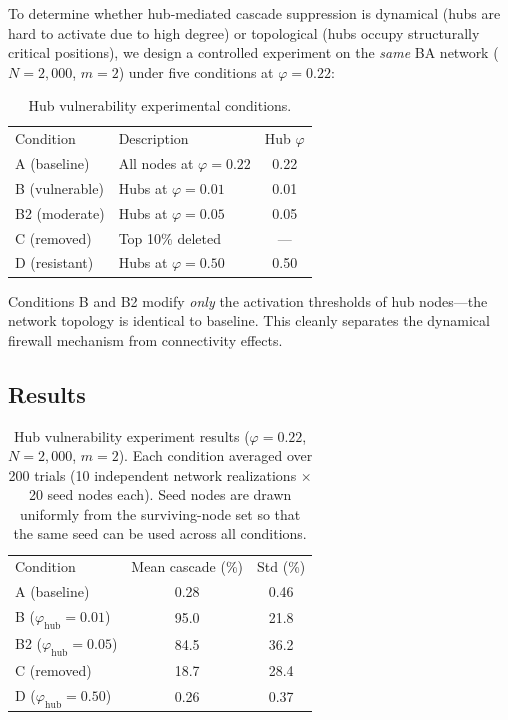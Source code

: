 \documentclass[aps,pre,twocolumn,superscriptaddress,showpacs]{revtex4-2}
\begin{document}
To determine whether hub-mediated cascade suppression is dynamical (hubs are hard to activate due to high degree) or topological (hubs occupy structurally critical positions), we design a controlled experiment on the \emph{same} BA network ($N=2{,}000$, $m=2$) under five conditions at $\varphi=0.22$:

\begin{table}[h]
\caption{Hub vulnerability experimental conditions.}
\label{tab:conditions}
\begin{ruledtabular}
\begin{tabular}{llc}
\textrm{Condition} & \textrm{Description} & \multicolumn{1}{c}{\textrm{Hub } $\varphi$} \\
\colrule
A (baseline) & All nodes at $\varphi=0.22$ & 0.22 \\
B (vulnerable) & Hubs at $\varphi=0.01$ & 0.01 \\
B2 (moderate) & Hubs at $\varphi=0.05$ & 0.05 \\
C (removed) & Top 10\% deleted & \multicolumn{1}{c}{---} \\
D (resistant) & Hubs at $\varphi=0.50$ & 0.50 \\
\end{tabular}
\end{ruledtabular}
\end{table}

Conditions B and B2 modify \emph{only} the activation thresholds of hub nodes---the network topology is identical to baseline. This cleanly separates the dynamical firewall mechanism from connectivity effects.

\subsection{Results}

\begin{table}[h]
\caption{Hub vulnerability experiment results ($\varphi=0.22$, $N=2{,}000$, $m=2$). Each condition averaged over 200 trials (10 independent network realizations $\times$ 20 seed nodes each). Seed nodes are drawn uniformly from the surviving-node set so that the same seed can be used across all conditions.}
\label{tab:hub_vuln}
\begin{ruledtabular}
\begin{tabular}{lcc}
\textrm{Condition} & \textrm{Mean cascade (\%)} & \multicolumn{1}{c}{\textrm{Std (\%)}} \\
\colrule
A (baseline) & 0.28 & 0.46 \\
B ($\varphi_{\mathrm{hub}}=0.01$) & 95.0 & 21.8 \\
B2 ($\varphi_{\mathrm{hub}}=0.05$) & 84.5 & 36.2 \\
C (removed) & 18.7 & 28.4 \\
D ($\varphi_{\mathrm{hub}}=0.50$) & 0.26 & 0.37 \\
\end{tabular}
\end{ruledtabular}
\end{table}
\end{document}
